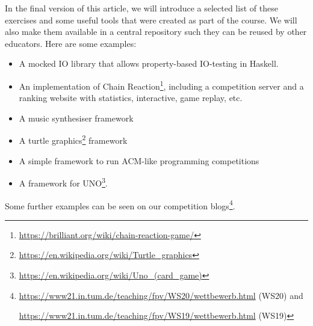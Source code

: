 In the final version of this article,
we will introduce a selected list of
these exercises and some useful tools
that were created as part of the course.
We will also make them available in a central repository
such they can be reused by other educators.
Here are some examples:
\begin{itemize}
\item A mocked IO library that allows property-based IO-testing in Haskell.
\item An implementation of Chain Reaction\footnote{\url{ https://brilliant.org/wiki/chain-reaction-game/}},
including a competition server
and a ranking website with statistics,
interactive, game replay, etc.
\item A music synthesiser framework
\item A turtle graphics\footnote{\url{https://en.wikipedia.org/wiki/Turtle_graphics}} framework
\item A simple framework to run ACM-like programming competitions
\item A framework for UNO\footnote{\url{https://en.wikipedia.org/wiki/Uno_(card_game)}}.
\end{itemize}
Some further examples can be seen on our competition blogs\footnote{\url{https://www21.in.tum.de/teaching/fpv/WS20/wettbewerb.html} (WS20) and

\url{https://www21.in.tum.de/teaching/fpv/WS19/wettbewerb.html} (WS19)}.



